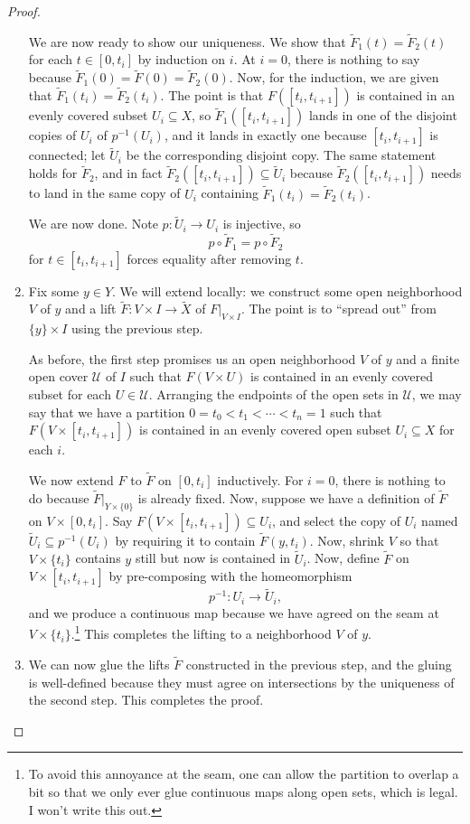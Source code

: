 \documentclass[../notes.tex]{subfiles}
\begin{document}
\begin{proof}
\begin{enumerate}
		We are now ready to show our uniqueness. We show that $\widetilde F_1(t)=\widetilde F_2(t)$ for each $t\in[0,t_i]$ by induction on $i$. At $i=0$, there is nothing to say because $\widetilde F_1(0)=\widetilde F(0)=\widetilde F_2(0)$. Now, for the induction, we are given that $\widetilde F_1(t_i)=\widetilde F_2(t_i)$. The point is that $F([t_i,t_{i+1}])$ is contained in an evenly covered subset $U_i\subseteq X$, so $\widetilde F_1([t_i,t_{i+1}])$ lands in one of the disjoint copies of $U_i$ of $p^{-1}(U_i)$, and it lands in exactly one because $[t_i,t_{i+1}]$ is connected; let $\widetilde U_i$ be the corresponding disjoint copy. The same statement holds for $\widetilde F_2$, and in fact $\widetilde F_2([t_i,t_{i+1}])\subseteq\widetilde U_i$ because $\widetilde F_2([t_i,t_{i+1}])$ needs to land in the same copy of $U_i$ containing $\widetilde F_1(t_i)=\widetilde F_2(t_i)$.

		We are now done. Note $p\colon\widetilde U_i\to U_i$ is injective, so
		\[p\circ\widetilde F_1=p\circ\widetilde F_2\]
		for $t\in[t_i,t_{i+1}]$ forces equality after removing $t$.

		\item Fix some $y\in Y$. We will extend locally: we construct some open neighborhood $V$ of $y$ and a lift $\widetilde F\colon V\times I\to\widetilde X$ of $F|_{V\times I}$. The point is to ``spread out'' from $\{y\}\times I$ using the previous step.

		As before, the first step promises us an open neighborhood $V$ of $y$ and a finite open cover $\mathcal U$ of $I$ such that $F(V\times U)$ is contained in an evenly covered subset for each $U\in\mathcal U$. Arranging the endpoints of the open sets in $\mathcal U$, we may say that we have a partition $0=t_0<t_1<\cdots<t_n=1$ such that $F(V\times[t_i,t_{i+1}])$ is contained in an evenly covered open subset $U_i\subseteq X$ for each $i$.

		We now extend $F$ to $\widetilde F$ on $[0,t_i]$ inductively. For $i=0$, there is nothing to do because $\widetilde F|_{Y\times\{0\}}$ is already fixed. Now, suppose we have a definition of $\widetilde F$ on $V\times[0,t_i]$. Say $F(V\times[t_i,t_{i+1}])\subseteq U_i$, and select the copy of $U_i$ named $\widetilde U_i\subseteq p^{-1}(U_i)$ by requiring it to contain $\widetilde F(y,t_i)$. Now, shrink $V$ so that $V\times\{t_i\}$ contains $y$ still but now is contained in $\widetilde U_i$. Now, define $\widetilde F$ on $V\times[t_i,t_{i+1}]$ by pre-composing with the homeomorphism
		\[p^{-1}\colon U_i\to\widetilde U_i,\]
		and we produce a continuous map because we have agreed on the seam at $V\times\{t_i\}$.\footnote{To avoid this annoyance at the seam, one can allow the partition to overlap a bit so that we only ever glue continuous maps along open sets, which is legal. I won't write this out.} This completes the lifting to a neighborhood $V$ of $y$.

		\item We can now glue the lifts $\widetilde F$ constructed in the previous step, and the gluing is well-defined because they must agree on intersections by the uniqueness of the second step. This completes the proof.
		\qedhere
	\end{enumerate}
\end{proof}
\end{document}

